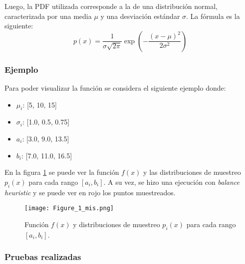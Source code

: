 \documentclass{article}
\begin{document}
Luego, la PDF utilizada corresponde a la de una distribución normal, caracterizada por una media \( \mu \) y una desviación estándar \( \sigma \). La fórmula es la siguiente:
$$
p(x) = \frac{1}{\sigma \sqrt{2\pi}} \exp\left(-\frac{(x - \mu)^2}{2\sigma^2}\right)
$$


\subsubsection{Ejemplo}

Para poder visualizar la función se considera el siguiente ejemplo donde:

\begin{itemize}
    \item \textbf{\( \mu_{i} \)}: [5, 10, 15]
    \item \textbf{\( \sigma_{i} \)}: [1.0, 0.5, 0.75]
    \item \textbf{\( a_{i} \)}: [3.0, 9.0, 13.5]
    \item \textbf{\( b_{i} \)}: [7.0, 11.0, 16.5]
\end{itemize}

En la figura \ref{fig:mis1} se puede ver la función \( f(x) \) y las distribuciones de muestreo \( p_{i}(x) \) para cada rango \( [a_{i}, b_{i}] \).
A su vez, se hizo una ejecución con \textit{balance heuristic} y se puede ver en rojo los puntos muestreados.

\begin{figure}[H]
\texttt{[image: Figure\_1\_mis.png]}
\caption{Función \( f(x) \) y distribuciones de muestreo \( p_{i}(x) \) para cada rango \( [a_{i}, b_{i}] \).}
\label{fig:mis1}
\end{figure}

\subsubsection{Pruebas realizadas}
\end{document}
